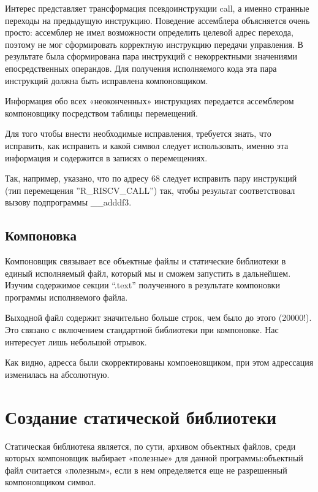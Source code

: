 Интерес представляет трансформация псевдоинструкции call, а именно странные переходы на предыдущую инструкцию. Поведение ассемблера объясняется очень просто: ассемблер не имел возможности определить целевой адрес перехода, поэтому не мог сформировать корректную инструкцию передачи управления. В
результате была сформирована пара инструкций с некорректными  значениями епосредственных операндов. Для получения исполняемого кода эта пара инструкций должна быть исправлена компоновщиком.

Информация обо всех «неоконченных» инструкциях передается ассемблером компоновщику
посредством таблицы перемещений.

Для того чтобы внести необходимые исправления, требуется знать, что исправить, как исправить и
какой символ следует использовать, именно эта информация и содержится в записях о
перемещениях.


\parindent=1cm

Так, например, указано, что по адресу 68 следует
исправить пару инструкций (тип перемещения ''R\_RISCV\_CALL'') так, чтобы результат
соответствовал вызову подпрограммы \_\_adddf3.

\subsection{Компоновка}
Компоновщик связывает все объектные файлы и статические библиотеки в единый исполняемый файл, который мы и сможем запустить в дальнейшем. Изучим содержимое секции “.text” полученного в результате компоновки программы
исполняемого файла. 

Выходной файл содержит значительно больше строк, чем было до этого (20000!). Это связано с включением стандартной библиотеки при компоновке. Нас интересует лишь небольшой отрывок.


\parindent=1cm

Как видно, адресса были скорректированы компоеновщиком, при этом адрессация изменилась на абсолютную. 

\section{Создание статической библиотеки}
Статическая библиотека является, по сути, архивом объектных файлов, среди которых компоновщик выбирает «полезные» для данной программы:объектный файл считается «полезным», если в нем определяется еще не разрешенный компоновщиком символ.

